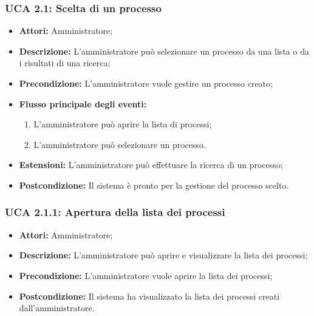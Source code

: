 \subsubsection{UCA 2.1: Scelta di un processo}
\begin{itemize}
\item \textbf{Attori:} Amministratore;
\item \textbf{Descrizione:} L'amministratore può selezionare un processo da una lista o da i risultati di una ricerca;
\item \textbf{Precondizione:} L'amministratore vuole gestire un processo creato;
\item \textbf{Flusso principale degli eventi:}
\begin{enumerate}
\item L'amministratore può aprire la lista di processi;
\item L'amministratore può selezionare un processo.
\end{enumerate}
\item \textbf{Estensioni:} L'amministratore può effettuare la ricerca di un processo;
\item \textbf{Postcondizione:} Il sistema è pronto per la gestione del processo scelto.
\end{itemize}

\hypertarget{A2.1.1}{}
\subsubsection{UCA 2.1.1: Apertura della lista dei processi}
\begin{itemize}
\item \textbf{Attori:} Amministratore;
\item \textbf{Descrizione:} L'amministratore può aprire e visualizzare la lista dei processi;
\item \textbf{Precondizione:} L'amministratore vuole aprire la lista dei processi;
\item \textbf{Postcondizione:} Il sistema ha visualizzato la lista dei processi creati dall'amministratore.
\end{itemize}

